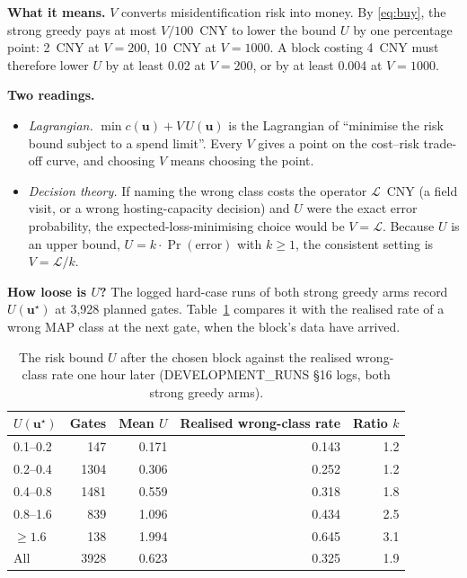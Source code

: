 \documentclass[11pt]{article}
\theoremstyle{definition}
\newcommand{\bu}{\bm{u}}
\begin{document}
{\textbf{What it means.} $V$ converts misidentification risk into money. By \eqref{eq:buy}, the strong greedy pays at most $V/100$~CNY to lower the bound $U$ by one percentage point: 2~CNY at $V=200$, 10~CNY at $V=1000$. A block costing 4~CNY must therefore lower $U$ by at least 0.02 at $V=200$, or by at least 0.004 at $V=1000$.

\textbf{Two readings.}
\begin{itemize}
  \item \emph{Lagrangian.} $\min c(\bu)+V\,U(\bu)$ is the Lagrangian of ``minimise the risk bound subject to a spend limit''. Every $V$ gives a point on the cost--risk trade-off curve, and choosing $V$ means choosing the point.
  \item \emph{Decision theory.} If naming the wrong class costs the operator $\mathcal L$~CNY (a field visit, or a wrong hosting-capacity decision) and $U$ were the exact error probability, the expected-loss-minimising choice would be $V=\mathcal L$. Because $U$ is an upper bound, $U=k\cdot\Pr(\text{error})$ with $k\ge1$, the consistent setting is $V=\mathcal L/k$.
\end{itemize}

\textbf{How loose is $U$?} The logged hard-case runs of both strong greedy arms record $U(\bu^\star)$ at 3{,}928 planned gates. Table~\ref{tab:calib} compares it with the realised rate of a wrong MAP class at the next gate, when the block's data have arrived.

\begin{table}[h]
\centering
\caption{The risk bound $U$ after the chosen block against the realised wrong-class rate one hour later (DEVELOPMENT\_RUNS \S16 logs, both strong greedy arms).}\label{tab:calib}
\begin{tabular}{@{}lrrrr@{}}
\toprule
$U(\bu^\star)$ & Gates & Mean $U$ & Realised wrong-class rate & Ratio $k$\\
\midrule
0.1--0.2 & 147 & 0.171 & 0.143 & 1.2\\
0.2--0.4 & 1304 & 0.306 & 0.252 & 1.2\\
0.4--0.8 & 1481 & 0.559 & 0.318 & 1.8\\
0.8--1.6 & 839 & 1.096 & 0.434 & 2.5\\
$\ge1.6$ & 138 & 1.994 & 0.645 & 3.1\\
\midrule
All & 3928 & 0.623 & 0.325 & 1.9\\
\bottomrule
\end{tabular}
\end{table}

}
\end{document}
